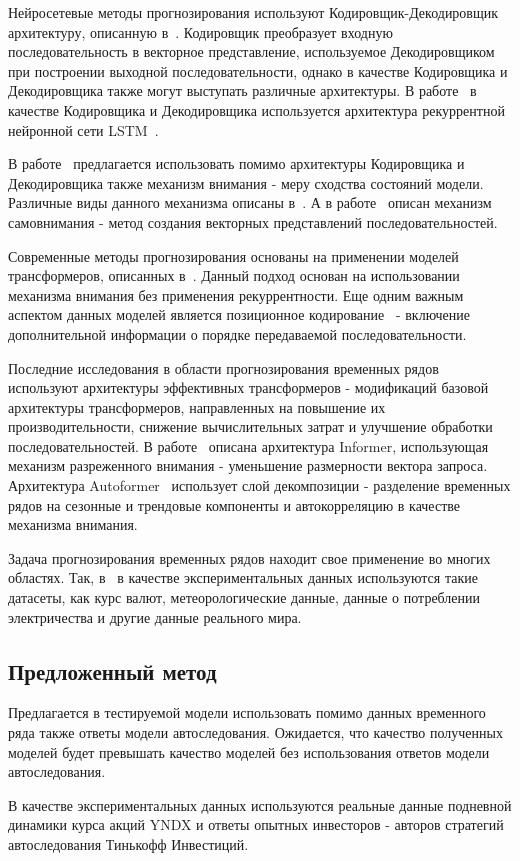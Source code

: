 Нейросетевые методы прогнозирования используют Кодировщик-Декодировщик архитектуру, описанную в~\cite{EncoderDecoder}. Кодировщик преобразует входную последовательность в векторное представление, используемое Декодировщиком при построении выходной последовательности, однако в качестве Кодировщика и Декодировщика также могут выступать различные архитектуры. В работе~\cite{EncoderDecoder} в качестве Кодировщика и Декодировщика используется архитектура рекуррентной нейронной сети LSTM~\cite{LSTM1, LSTM2}.

В работе~\cite{RNN Attention} предлагается использовать помимо архитектуры Кодировщика и Декодировщика также механизм внимания - меру сходства состояний модели. Различные виды данного механизма описаны в~\cite{Attention Mechanisms}. А в работе~\cite{Self-Attention} описан механизм самовнимания - метод создания векторных представлений последовательностей.

Современные методы прогнозирования основаны на применении моделей трансформеров, описанных в~\cite{Attention is all you need}. Данный подход основан на использовании механизма внимания без применения рекуррентности. Еще одним важным аспектом данных моделей является позиционное кодирование~\cite{Positional Encoding} - включение дополнительной информации о порядке передаваемой последовательности.

Последние исследования в области прогнозирования временных рядов используют архитектуры эффективных трансформеров - модификаций базовой архитектуры трансформеров, направленных на повышение их производительности, снижение вычислительных затрат и улучшение обработки последовательностей. В работе~\cite{Informer} описана архитектура Informer, использующая механизм разреженного внимания - уменьшение размерности вектора запроса. Архитектура Autoformer~\cite{Autoformer} использует слой декомпозиции - разделение временных рядов на сезонные и трендовые компоненты и автокорреляцию в качестве механизма внимания.

Задача прогнозирования временных рядов находит свое применение во многих областях. Так, в~\cite{iTransformer} в качестве экспериментальных данных используются такие датасеты, как курс валют, метеорологические данные, данные о потреблении электричества и другие данные реального мира.

\subsection{Предложенный метод}

Предлагается в тестируемой модели использовать помимо данных временного ряда также ответы модели автоследования. Ожидается, что качество полученных моделей будет превышать качество моделей без использования ответов модели автоследования.

В качестве экспериментальных данных используются реальные данные подневной динамики курса акций YNDX и ответы опытных инвесторов - авторов стратегий автоследования Тинькофф Инвестиций.